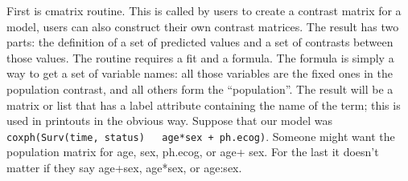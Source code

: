 \documentclass{article}
\newcommand{\code}[1]{\texttt{#1}}
\begin{document}
First is cmatrix routine.  This is called by users to create a contrast
matrix for a model, users can also construct their own contrast matrices.
The result has two parts: the definition of a set of predicted values and
a set of contrasts between those values.  
The routine requires a fit and a formula.  The formula is simply a way to
get a set of variable names: all those variables are the fixed ones in 
the population contrast, and all others form the ``population''.
The result will be a matrix or list that has a label
attribute containing the name of the term; this is used in printouts in the
obvious way.
Suppose that our model was \code{coxph(Surv(time, status) ~ age*sex + ph.ecog)}.
Someone might want the population matrix for age, sex, ph.ecog, or age+ sex.
For the last it doesn't matter if they say age+sex, age*sex, or age:sex.
  
\end{document}
